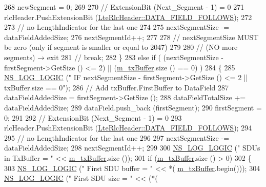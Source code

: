 \begin{DoxyCode}
268           newSegment = 0;
269 
270           \textcolor{comment}{// ExtensionBit (Next\_Segment - 1) = 0}
271           rlcHeader.PushExtensionBit (\hyperlink{classns3_1_1LteRlcHeader_a48248337dcddd6c1f6f79b75b898266aa244934a97b8fe6ca2786896ca48f04dd}{LteRlcHeader::DATA\_FIELD\_FOLLOWS});
272 
273           \textcolor{comment}{// no LengthIndicator for the last one}
274 
275           nextSegmentSize -= dataFieldAddedSize;
276           nextSegmentId++;
277 
278           \textcolor{comment}{// nextSegmentSize MUST be zero (only if segment is smaller or equal to 2047)}
279 
280           \textcolor{comment}{// (NO more segments) → exit}
281           \textcolor{comment}{// break;}
282         \}
283       \textcolor{keywordflow}{else} \textcolor{keywordflow}{if} ( (nextSegmentSize - firstSegment->GetSize () <= 2) || (\hyperlink{classns3_1_1LteRlcUm_ac2c10aa57585dbea3797d651f3dce7be}{m\_txBuffer}.size () == 0) )
284         \{
285           \hyperlink{group__logging_ga88acd260151caf2db9c0fc84997f45ce}{NS\_LOG\_LOGIC} (\textcolor{stringliteral}{"    IF nextSegmentSize - firstSegment->GetSize () <= 2 ||
       txBuffer.size == 0"});
286           \textcolor{comment}{// Add txBuffer.FirstBuffer to DataField}
287           dataFieldAddedSize = firstSegment->GetSize ();
288           dataFieldTotalSize += dataFieldAddedSize;
289           dataField.push\_back (firstSegment);
290           firstSegment = 0;
291 
292           \textcolor{comment}{// ExtensionBit (Next\_Segment - 1) = 0}
293           rlcHeader.PushExtensionBit (\hyperlink{classns3_1_1LteRlcHeader_a48248337dcddd6c1f6f79b75b898266aa244934a97b8fe6ca2786896ca48f04dd}{LteRlcHeader::DATA\_FIELD\_FOLLOWS});
294 
295           \textcolor{comment}{// no LengthIndicator for the last one}
296 
297           nextSegmentSize -= dataFieldAddedSize;
298           nextSegmentId++;
299 
300           \hyperlink{group__logging_ga88acd260151caf2db9c0fc84997f45ce}{NS\_LOG\_LOGIC} (\textcolor{stringliteral}{"        SDUs in TxBuffer  = "} << \hyperlink{classns3_1_1LteRlcUm_ac2c10aa57585dbea3797d651f3dce7be}{m\_txBuffer}.size ());
301           \textcolor{keywordflow}{if} (\hyperlink{classns3_1_1LteRlcUm_ac2c10aa57585dbea3797d651f3dce7be}{m\_txBuffer}.size () > 0)
302             \{
303               \hyperlink{group__logging_ga88acd260151caf2db9c0fc84997f45ce}{NS\_LOG\_LOGIC} (\textcolor{stringliteral}{"        First SDU buffer  = "} << *(
      \hyperlink{classns3_1_1LteRlcUm_ac2c10aa57585dbea3797d651f3dce7be}{m\_txBuffer}.begin()));
304               \hyperlink{group__logging_ga88acd260151caf2db9c0fc84997f45ce}{NS\_LOG\_LOGIC} (\textcolor{stringliteral}{"        First SDU size    = "} << (*(

\end{DoxyCode}
